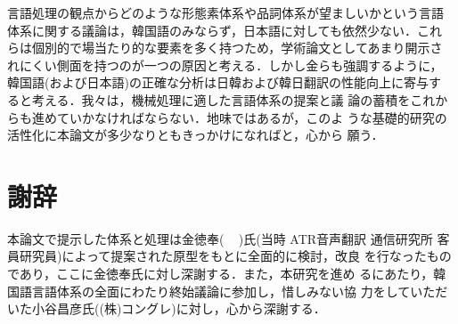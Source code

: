 言語処理の観点からどのような形態素体系や品詞体系が望ましいかという言語
体系に関する議論は，韓国語のみならず，日本語に対しても依然少ない．これ
らは個別的で場当たり的な要素を多く持つため，学術論文としてあまり開示さ
れにくい側面を持つのが一つの原因と考える．しかし金らも強調するように，
韓国語(および日本語)の正確な分析は日韓および韓日翻訳の性能向上に寄与す
ると考える\cite{日韓評価}．我々は，機械処理に適した言語体系の提案と議
論の蓄積をこれからも進めていかなければならない．地味ではあるが，このよ
うな基礎的研究の活性化に本論文が多少なりともきっかけになればと，心から
願う．


\section*{謝辞}


本論文で提示した体系と処理は金徳奉(
\ 
)氏(当時 ATR音声翻訳
通信研究所 客員研究員)によって提案された原型をもとに全面的に検討，改良
を行なったものであり，ここに金徳奉氏に対し深謝する．また，本研究を進め
るにあたり，韓国語言語体系の全面にわたり終始議論に参加し，惜しみない協
力をしていただいた小谷昌彦氏((株)コングレ)に対し，心から深謝する．



